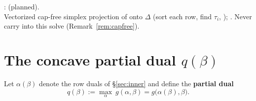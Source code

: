 \documentclass[11pt,a4paper]{article}
\begin{document}
\begin{tcolorbox}[colback=blue!4!white, colframe=blue!40!black,
                  title={Code: inner solve}, fontupper=\small]
:  (planned).\\[2pt]
Vectorized cap-free simplex projection of  onto
$\Delta$ (sort each row, find $\tau_i$, );
. Never carry  into this solve (Remark~\ref{rem:capfree}).
\end{tcolorbox}

\section{The concave partial dual \texorpdfstring{$q(\beta)$}{q(beta)}}
\label{sec:qbeta}
Let $\alpha(\beta)$ denote the row duals of \S\ref{sec:inner} and define the \textbf{partial
dual}
\begin{equation}
  q(\beta):=\max_{\alpha}\ g(\alpha,\beta)=g\bigl(\alpha(\beta),\beta\bigr).
  \label{eq:qdef}
\end{equation}
\end{document}
